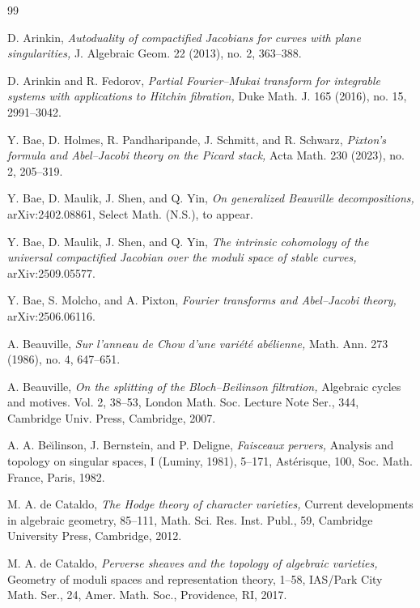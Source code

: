 \documentclass[11pt]{amsart}
\theoremstyle{plain}
\theoremstyle{definition}
\theoremstyle{remark}
\begin{document}
\begin{thebibliography}{99}

 D. Arinkin, {\em Autoduality of compactified Jacobians for curves with plane singularities,} J. Algebraic Geom. 22 (2013), no. 2, 363--388.

 D. Arinkin and R. Fedorov, {\em Partial Fourier--Mukai transform for integrable systems with applications to Hitchin fibration,} Duke Math. J. 165 (2016), no. 15, 2991--3042.

 Y. Bae, D. Holmes, R. Pandharipande, J. Schmitt, and R. Schwarz, {\em Pixton's formula and Abel--Jacobi theory on the Picard stack,} Acta Math. 230 (2023), no. 2, 205--319.

 Y. Bae, D. Maulik, J. Shen, and Q. Yin, {\em  On generalized Beauville decompositions,} arXiv:2402.08861, Select Math. (N.S.), to appear.

 Y. Bae, D. Maulik, J. Shen, and Q. Yin, {\em The intrinsic cohomology of the universal compactified Jacobian over the moduli space of stable curves,} arXiv:2509.05577.

 Y. Bae, S. Molcho, and A. Pixton, {\em Fourier transforms and Abel--Jacobi theory,} arXiv:2506.06116.

 A. Beauville, {\em Sur l'anneau de Chow d’une vari\'et\'e ab\'elienne,} Math. Ann. 273 (1986), no. 4, 647--651.


 A. Beauville, {\em On the splitting of the Bloch–Beilinson filtration,} Algebraic cycles and motives. Vol. 2, 38--53, London Math. Soc. Lecture Note Ser., 344, Cambridge Univ. Press, Cambridge, 2007.

 A. A. Be\u{\i}linson, J. Bernstein, and P. Deligne, {\em Faisceaux pervers,} Analysis and topology on singular spaces, I (Luminy, 1981), 5--171, Ast\'erisque, 100, Soc. Math. France, Paris, 1982.

 M. A. de Cataldo, {\em The Hodge theory of character varieties,} Current developments in algebraic geometry, 85--111, Math. Sci. Res. Inst. Publ., 59, Cambridge University Press, Cambridge, 2012.

 M. A. de Cataldo, {\em Perverse sheaves and the topology of algebraic varieties,} Geometry of moduli spaces and representation theory, 1--58, IAS/Park City Math. Ser., 24, Amer. Math. Soc., Providence, RI, 2017.


\end{thebibliography}
\end{document}
